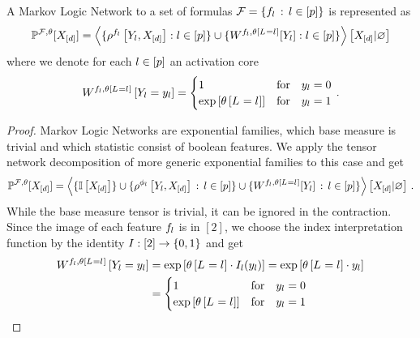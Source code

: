 \begin{theorem}\label{the:mlnTensorRep}
	A Markov Logic Network to a set of formulas $\mathcal{F} = \{f_{l} \, : \, l\in[p]\}$ is represented as
	\begin{align*}
		\mathbb{P}^{\mathcal{F},\theta}[X_{[d]}] = 
		\left\langle \{\rho^{f_{l}}\left[Y_{l},X_{[d]}\right] : l\in[p] \} \cup \{W^{f_{l},\theta\left[L_{}=l_{}\right]}[Y_{l}] : l\in[p] \}
		\right\rangle \left[ X_{[d]} | \varnothing \right]
	\end{align*}
	where we denote for each $l\in[p]$ an activation core
	\begin{align*}
		W^{f_{l},\theta\left[L_{}=l_{}\right]}\left[Y_{l}=y_{l}\right]
		= \begin{cases}
			1 & \text{for} \quad y_{l} = 0 \\
			\mathrm{exp}\left[\theta\left[L_{}=l_{}\right]\right] & \text{for} \quad y_{l}  = 1
		\end{cases}  \, .
	\end{align*}
\end{theorem}
\begin{proof}
	Markov Logic Networks are exponential families, which base measure is trivial and which statistic consist of boolean features.
	We apply the tensor network decomposition of more generic exponential families  to this case and get
	\begin{align*}
        \mathbb{P}^{\mathcal{F},\theta}[X_{[d]}] =
        \left\langle \{\mathbb{I}\left[X_{[d]}\right]\}
		\cup \{\rho^{\phi_{l}}\left[Y_{l},X_{[d]}\right] \, : \, l\in[p]\}
		\cup\{W^{f_{l},\theta\left[L_{}=l_{}\right]}[Y_{l}]\, : \, l\in[p]\}\right\rangle \left[ X_{[d]} | \varnothing \right] \, .
    \end{align*}
	While the base measure tensor is trivial, it can be ignored in the contraction.
	Since the image of each feature $f_{l}$ is in $[2]$, we choose the index interpretation function by the identity $I : [2] \rightarrow \{0,1\}$ and get
	\begin{align*}
		W^{f_{l},\theta\left[L_{}=l_{}\right]}\left[Y_{l}=y_{l}\right]
		&= \mathrm{exp}\left[\theta\left[L_{}=l_{}\right] \cdot I_{l}(y_{l}) \right]
		= \mathrm{exp}\left[\theta\left[L_{}=l_{}\right] \cdot y_{l}\right] \\
		&= \begin{cases}
			1 & \text{for} \quad y_{l} = 0 \\
			\mathrm{exp}\left[\theta\left[L_{}=l_{}\right]\right] & \text{for} \quad y_{l}  = 1
		\end{cases}
	\end{align*}
\end{proof}

